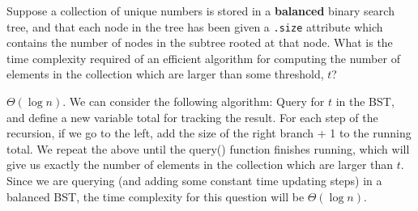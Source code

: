 \begin{prob}
    Suppose a collection of unique numbers is stored in a \textbf{balanced}
    binary search tree, and that each node in the tree has been given a
    \texttt{.size} attribute which contains the number of nodes in the subtree
    rooted at that node. What is the time complexity required of an efficient
    algorithm for computing the number of elements in the collection which are
    larger than some threshold, $t$?

    \begin{soln}
        $\Theta(\log{n})$. We can consider the following algorithm: Query for $t$ in the BST, 
        and define a new variable total for tracking the result.
        For each step of the recursion, if we go to the left, add the size of the right branch 
        + 1 to the running total. We repeat the above until the query() function finishes running, 
        which will give us exactly the number of elements in the collection which are larger than 
        $t$. Since we are querying (and adding some constant time updating steps) in a balanced 
        BST, the time complexity for this question will be $\Theta(\log{n})$.
    \end{soln}

\end{prob}
